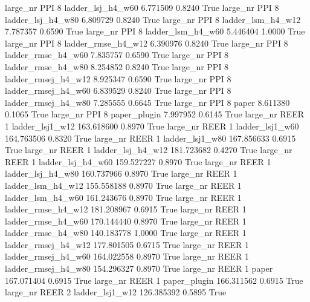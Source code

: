  large_nr      PPI                 8   ladder_lsj_h4_w60    6.771509      0.8240    True
  large_nr      PPI                 8   ladder_lsj_h4_w80    6.809729      0.8240    True
  large_nr      PPI                 8   ladder_lsm_h4_w12    7.787357      0.6590    True
  large_nr      PPI                 8   ladder_lsm_h4_w60    5.446404      1.0000    True
  large_nr      PPI                 8  ladder_rmse_h4_w12    6.390976      0.8240    True
  large_nr      PPI                 8  ladder_rmse_h4_w60    7.835757      0.6590    True
  large_nr      PPI                 8  ladder_rmse_h4_w80    8.254852      0.8240    True
  large_nr      PPI                 8 ladder_rmsej_h4_w12    8.925347      0.6590    True
  large_nr      PPI                 8 ladder_rmsej_h4_w60    6.839529      0.8240    True
  large_nr      PPI                 8 ladder_rmsej_h4_w80    7.285555      0.6645    True
  large_nr      PPI                 8               paper    8.611380      0.1065    True
  large_nr      PPI                 8        paper_plugin    7.997952      0.6145    True
  large_nr     REER                 1     ladder_lsj1_w12  163.618600      0.8970    True
  large_nr     REER                 1     ladder_lsj1_w60  164.763506      0.8320    True
  large_nr     REER                 1     ladder_lsj1_w80  167.856633      0.6915    True
  large_nr     REER                 1   ladder_lsj_h4_w12  181.723682      0.4270    True
  large_nr     REER                 1   ladder_lsj_h4_w60  159.527227      0.8970    True
  large_nr     REER                 1   ladder_lsj_h4_w80  160.737966      0.8970    True
  large_nr     REER                 1   ladder_lsm_h4_w12  155.558188      0.8970    True
  large_nr     REER                 1   ladder_lsm_h4_w60  161.243676      0.8970    True
  large_nr     REER                 1  ladder_rmse_h4_w12  181.208967      0.6915    True
  large_nr     REER                 1  ladder_rmse_h4_w60  170.144440      0.8970    True
  large_nr     REER                 1  ladder_rmse_h4_w80  140.183778      1.0000    True
  large_nr     REER                 1 ladder_rmsej_h4_w12  177.801505      0.6715    True
  large_nr     REER                 1 ladder_rmsej_h4_w60  164.022558      0.8970    True
  large_nr     REER                 1 ladder_rmsej_h4_w80  154.296327      0.8970    True
  large_nr     REER                 1               paper  167.071404      0.6915    True
  large_nr     REER                 1        paper_plugin  166.311562      0.6915    True
  large_nr     REER                 2     ladder_lsj1_w12  126.385392      0.5895    True
